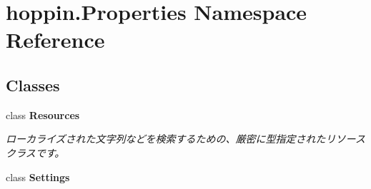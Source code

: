 \hypertarget{namespacehoppin_1_1_properties}{}\section{hoppin.\+Properties Namespace Reference}
\label{namespacehoppin_1_1_properties}
\subsection*{Classes}
\begin{DoxyCompactItemize}
\item 
class {\bfseries Resources}
\begin{DoxyCompactList}\small\item\em ローカライズされた文字列などを検索するための、厳密に型指定されたリソース クラスです。 \end{DoxyCompactList}\item 
class {\bfseries Settings}
\end{DoxyCompactItemize}
